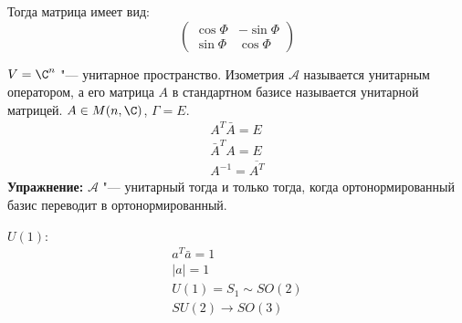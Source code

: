 \begin{exmp}
	Тогда матрица имеет вид:
	\[\begin{pmatrix}
		\cos \Phi & -\sin \Phi \\
		\sin \Phi &  \cos \Phi
	\end{pmatrix}\]
\end{exmp}
\begin{Def}
	$V = \C^n$ "--- унитарное пространство.
	Изометрия $\mathcal A$ называется  унитарным оператором, а его матрица $A$ в стандартном базисе называется унитарной матрицей.
	$A \in M(n, \C)$, $\Gamma = E$.
	\begin{gather*}
		A^T \bar A  = E \\
		\bar A^T A = E \\
		A^{-1} = \overline{A^T}
	\end{gather*}
	\textbf{Упражнение:} $\mathcal A$ "--- унитарный тогда и только тогда, когда ортонормированный базис переводит в ортонормированный.
\end{Def}
\begin{exmp}
	$U(1)$:
	\begin{gather*}
		a^T \bar a  = 1 \\
		|a| = 1 \\
		U(1) = S_1 \sim SO(2) \\
		SU(2) \to SO(3)
	\end{gather*}
\end{exmp}
